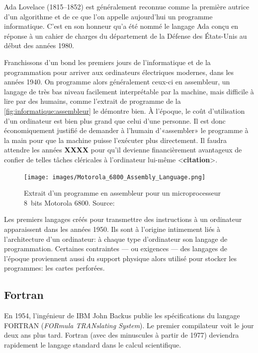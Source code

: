Ada Lovelace (1815--1852) est généralement reconnue comme la première
autrice d'un algorithme et de ce que l'on appelle aujourd'hui un
programme informatique. C'est en son honneur qu'a été nommé le langage
Ada conçu en réponse à un cahier de charges du département de la
Défense des États-Unis au début des années 1980.

Franchissons d'un bond les premiers jours de l'informatique et de la
programmation pour arriver aux ordinateurs électriques modernes, dans
les années 1940. On programme alors généralement ceux-ci en
assembleur, un langage de très bas niveau facilement
interprétable par la machine, mais difficile à lire par des humains,
comme l'extrait de programme de la
\autoref{fig:informatique:assembleur} le démontre bien. À l'époque, le
coût d'utilisation d'un ordinateur est bien plus grand que celui d'une
personne. Il est donc économiquement justifié de demander à l'humain
d'«assembler» le programme à la main pour que la machine puisse
l'exécuter plus directement. Il faudra attendre les années
\textbf{XXXX} pour qu'il devienne financièrement avantageux de confier
de telles tâches cléricales à l'ordinateur lui-même <\textbf{citation}>.

\begin{figure}
  \centering
  \texttt{[image: images/Motorola\_6800\_Assembly\_Language.png]}
  \caption[Programme en assembleur pour un microprocesseur 8~bits
    Motorola 6800]{Extrait d'un programme en assembleur pour un
    microprocesseur 8~bits Motorola 6800. {\small Source:
      }}
  \label{fig:informatique:assembleur}
\end{figure}

Les premiers langages créés pour transmettre des instructions à un
ordinateur apparaissent dans les années 1950. Ils sont à l'origine
intimement liés à l'architecture d'un ordinateur: à chaque type
d'ordinateur son langage de programmation. Certaines contraintes ---
ou exigences --- des langages de l'époque proviennent aussi du support
physique alors utilisé pour stocker les programmes: les cartes
perforées.

\subsection{Fortran}
\label{sec:informatique:historique:fortran}

En 1954, l'ingénieur de IBM John Backus publie les spécifications du
langage FORTRAN (\emph{FORmula TRANslating System}). Le
premier compilateur voit le jour deux ans plus tard. Fortran (avec des
minuscules à partir de 1977) deviendra rapidement le langage standard
dans le calcul scientifique.

